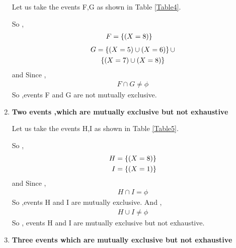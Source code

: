 \documentclass[journal,12pt,twocolumn]{IEEEtran}
\begin{document}
\begin{enumerate}[label=(\roman*)]
    Let us take the events F,G as shown in Table \ref{Table4}.
    \begin{table}[ht!]
        
        \caption{}
        \label{Table4}
    \end{table}
    So ,
    \begin{align}
        F &= \left\{(X=8)\right\}
    \end{align}
    \begin{multline}
	    G =  \left\{(X=5) \cup (X=6)\right\} \cup \\
	         \left\{(X=7) \cup (X=8)\right\}
    \end{multline}
    and Since ,
    \begin{align}
        F \cap G \neq \phi
    \end{align}
    So ,events F and G are not mutually exclusive.
  
    \item \textbf{Two events ,which are mutually exclusive but not exhaustive}
    
    Let us take the events H,I as shown in Table \ref{Table5}.
    \begin{table}[ht!]
        
        \caption{}
        \label{Table5}
    \end{table}
    So ,
    \begin{align}
        H &= \left\{ (X=8) \right\} \\
        I &= \left\{ (X=1) \right\}
    \end{align}
    and Since ,
    \begin{align}
        H \cap I = \phi
    \end{align}
    So ,events H and I are mutually exclusive. And ,
    \begin{align}
        H \cup I \neq \phi
    \end{align}
    So , events H and I are mutually exclusive but not exhaustive.
    
    \item \textbf{Three events which are mutually exclusive but not exhaustive}
    

\end{enumerate}
\end{document}
